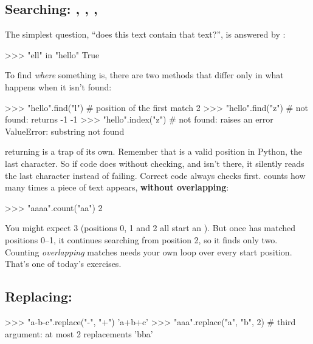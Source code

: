 \documentclass[10pt,a4paper]{article}
\begin{document}
\subsection{Searching: , , , }
The simplest question, “does this text contain that text?”, is answered by :
\begin{txtcode}
>>> "ell" in "hello"
True
\end{txtcode}
To find \emph{where} something is, there are two methods that differ only in what happens when it isn’t found:
\begin{txtcode}
>>> "hello".find("l")      # position of the first match
2
>>> "hello".find("z")      # not found: returns -1
-1
>>> "hello".index("z")     # not found: raises an error
ValueError: substring not found
\end{txtcode}
 returning  is a trap of its own. Remember that  is a valid position in Python, the last character. So if code does  without checking, and  isn’t there, it silently reads the last character instead of failing. Correct code always checks  first.
 counts how many times a piece of text appears, \textbf{without overlapping}:
\begin{txtcode}
>>> "aaaa".count("aa")
2
\end{txtcode}
You might expect 3 (positions 0, 1 and 2 all start an ). But once  has matched positions 0–1, it continues searching from position 2, so it finds only two. Counting \emph{overlapping} matches needs your own loop over every start position. That’s one of today’s exercises.
\subsection{Replacing: }
\begin{txtcode}
>>> "a-b-c".replace("-", "+")
'a+b+c'
>>> "aaa".replace("a", "b", 2)     # third argument: at most 2 replacements
'bba'
\end{txtcode}
\end{document}
